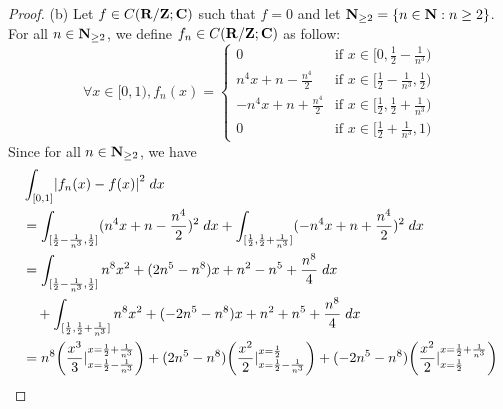 \begin{proof}{(b)}
    Let \(f \in C(\mathbf{R} / \mathbf{Z} ; \mathbf{C})\) such that \(f = 0\) and let \(\mathbf{N}_{\geq 2} = \{n \in \mathbf{N} : n \geq 2\}\).
    For all \(n \in \mathbf{N}_{\geq 2}\), we define \(f_n \in C(\mathbf{R} / \mathbf{Z} ; \mathbf{C})\) as follow:
    \[
        \forall x \in [0, 1), f_n(x) = \begin{cases}
            0                          & \text{if } x \in [0, \frac{1}{2} - \frac{1}{n^3})           \\
            n^4 x + n - \frac{n^4}{2}  & \text{if } x \in [\frac{1}{2} - \frac{1}{n^3}, \frac{1}{2}) \\
            -n^4 x + n + \frac{n^4}{2} & \text{if } x \in [\frac{1}{2}, \frac{1}{2} + \frac{1}{n^3}) \\
            0                          & \text{if } x \in [\frac{1}{2} + \frac{1}{n^3}, 1)
        \end{cases}
    \]
    Since for all \(n \in \mathbf{N}_{\geq 2}\), we have
    \begin{align*}
         & \int_{[0, 1]} \abs{f_n(x) - f(x)}^2 \; dx                                                                                                                                                                                                                                                         \\
         & = \int_{[\frac{1}{2} - \frac{1}{n^3}, \frac{1}{2}]} (n^4 x + n - \frac{n^4}{2})^2 \; dx + \int_{[\frac{1}{2}, \frac{1}{2} + \frac{1}{n^3}]} (-n^4 x + n + \frac{n^4}{2})^2 \; dx                                                                                                                  \\
         & = \int_{[\frac{1}{2} - \frac{1}{n^3}, \frac{1}{2}]} n^8 x^2 + (2n^5 - n^8) x + n^2 - n^5 + \frac{n^8}{4} \; dx                                                                                                                                                                                    \\
         & \quad + \int_{[\frac{1}{2}, \frac{1}{2} + \frac{1}{n^3}]} n^8 x^2 + (-2n^5 - n^8) x + n^2 + n^5 + \frac{n^8}{4} \; dx                                                                                                                                                                             \\
         & = n^8 \bigg(\frac{x^3}{3}|_{x = \frac{1}{2} - \frac{1}{n^3}}^{x = \frac{1}{2} + \frac{1}{n^3}}\bigg) + (2n^5 - n^8) \bigg(\frac{x^2}{2}|_{x = \frac{1}{2} - \frac{1}{n^3}}^{x = \frac{1}{2}}\bigg) + (-2n^5 - n^8) \bigg(\frac{x^2}{2}|_{x = \frac{1}{2}}^{x = \frac{1}{2} + \frac{1}{n^3}}\bigg) \\

\end{align*}
\end{proof}
